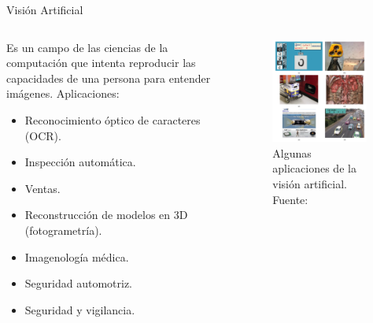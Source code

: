 \documentclass[10pt]{beamer}
\begin{document}
\begin{frame}{Visión Artificial}
    \begin{columns}
        \begin{column}{0.5\textwidth}
            Es un campo de las ciencias de la computación que intenta reproducir las capacidades de una persona para entender imágenes.
            Aplicaciones:
            \begin{itemize}
                \item \small{Reconocimiento óptico de caracteres (OCR).}
                \item Inspección automática.
                \item Ventas.
                \item Reconstrucción de modelos en 3D (fotogrametría).
                \item Imagenología médica.
                \item Seguridad automotriz.
                \item Seguridad y vigilancia.
            \end{itemize}
        \end{column}
        \begin{column}{0.5\textwidth}
            \begin{figure}[!h] 
                \centering
                \includegraphics[width=0.95\textwidth]{../img/cvision}
                \caption[Algunas aplicaciones de la visión artificial]{Algunas aplicaciones de la visión artificial. Fuente: \cite{Szeliski2011} }
            \end{figure}
        \end{column}
    \end{columns}
    
\end{frame}
\end{document}

